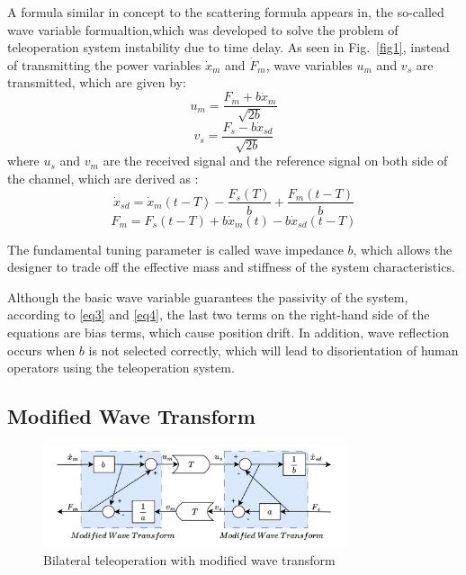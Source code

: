 A formula similar in concept to the scattering formula appears in\cite{b13},
the so-called wave variable formualtion,which was developed to solve the problem of
teleoperation system instability due to time  delay.
As seen in Fig.~\ref{fig1},
instead of transmitting the power variables  $\dot x_m$ and $\dot F_m$,
wave variables  $u_m$ and $v_s$ are transmitted,
which are given by:
\begin{equation}
    u_m = \frac{F_m + b \dot x_m}{\sqrt{2b}}\label{eq1}
\end{equation}
\begin{equation}
    v_s = \frac{F_s - b \dot x_{sd}}{\sqrt{2b}}\label{eq2}
\end{equation}
where $u_s$ and $v_m$ are the received signal
and the reference signal on both side of the channel, which are derived as
:
\begin{equation}
    \dot x_{sd}=\dot x_m(t-T)-\frac{F_s(T)}{b}+\frac{F_m(t-T)}{b}\label{eq3}
\end{equation}
\begin{equation}
    F_{m}=F_s(t-T)+b\dot x_m(t)-b\dot x_{sd}(t-T)\label{eq4}
\end{equation}

The fundamental tuning parameter is called wave impedance $b$,
which allows the designer to trade off the effective mass and
stiffness of the system characteristics.

\par Although the basic wave variable guarantees the passivity of the system\cite{b14},
according to \eqref{eq3} and \eqref{eq4},
the last two terms on the right-hand side of the equations are bias terms, which cause position drift.
In addition, wave reflection occurs when $b$ is not selected correctly\cite{b15},
which will lead to disorientation of human operators using the teleoperation system.

\subsection{Modified Wave Transform}
\begin{figure}[htbp]
    \centerline{\includegraphics[height=3cm,width=9cm]{2019.jpg}}
    \caption{Bilateral teleoperation with modified wave transform}
    \label{fig2}
\end{figure}

